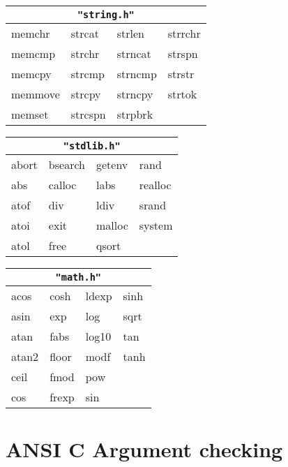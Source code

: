 \begin{center}
\begin{tabular}{|l l l l|}
\hline
\multicolumn{4}{|c|}{\tt "string.h"}\\
\hline
memchr      &strcat      &strlen      &strrchr  \\
memcmp      &strchr      &strncat     &strspn   \\
memcpy      &strcmp      &strncmp     &strstr   \\
memmove     &strcpy      &strncpy     &strtok   \\
memset      &strcspn     &strpbrk     &         \\
\hline
\end{tabular}
\end{center}

\begin{center}
\begin{tabular}{|l l l l|}
\hline
\multicolumn{4}{|c|}{\tt "stdlib.h"}\\
\hline
abort       &bsearch     &getenv      &rand     \\
abs         &calloc      &labs        &realloc  \\
atof        &div         &ldiv        &srand    \\
atoi        &exit        &malloc      &system   \\
atol        &free        &qsort       &         \\
\hline
\end{tabular}
\end{center}

\begin{center}
\begin{tabular}{|l l l l|}
\hline
\multicolumn{4}{|c|}{\tt "math.h"}\\
\hline
acos        &cosh        &ldexp       &sinh    \\
asin        &exp         &log         &sqrt    \\
atan        &fabs        &log10       &tan     \\
atan2       &floor       &modf        &tanh    \\
ceil        &fmod        &pow         &        \\
cos         &frexp       &sin         &        \\
\hline
\end{tabular}
\end{center}

\section{ANSI C Argument checking}


